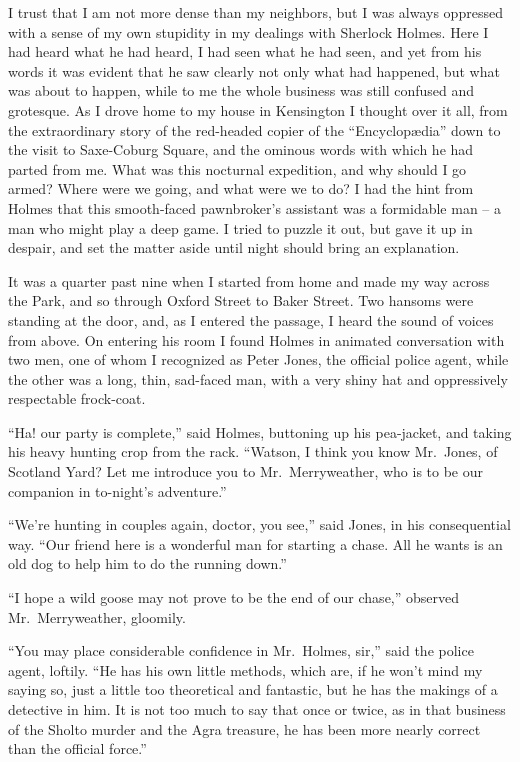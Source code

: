 I trust that I am not more dense than my neighbors, but I
was always oppressed with a sense of my own stupidity in my
dealings with Sherlock Holmes. Here I had heard what he
had heard, I had seen what he had seen, and yet from his
words it was evident that he saw clearly not only what had
happened, but what was about to happen, while to me the
whole business was still confused and grotesque. As I drove
home to my house in Kensington I thought over it all, from
the extraordinary story of the red-headed copier of the
“Encyclopædia” down to the visit to Saxe-Coburg Square, and
the ominous words with which he had parted from me. What
was this nocturnal expedition, and why should I go armed?
Where were we going, and what were we to do? I had the
hint from Holmes that this smooth-faced pawnbroker’s assistant
was a formidable man -- a man who might play a
deep game. I tried to puzzle it out, but gave it up in
despair, and set the matter aside until night should bring an
explanation.

It was a quarter past nine when I started from home and
made my way across the Park, and so through Oxford Street
to Baker Street. Two hansoms were standing at the door,
and, as I entered the passage, I heard the sound of voices
from above. On entering his room I found Holmes in animated
conversation with two men, one of whom I recognized
as Peter Jones, the official police agent, while the other was
a long, thin, sad-faced man, with a very shiny hat and oppressively
respectable frock-coat.

“Ha! our party is complete,” said Holmes, buttoning up
his pea-jacket, and taking his heavy hunting crop from the
rack. “Watson, I think you know Mr.~Jones, of Scotland
Yard? Let me introduce you to Mr.~Merryweather, who is
to be our companion in to-night’s adventure.”

“We’re hunting in couples again, doctor, you see,” said
Jones, in his consequential way. “Our friend here is a wonderful
man for starting a chase. All he wants is an old dog
to help him to do the running down.”

“I hope a wild goose may not prove to be the end of our
chase,” observed Mr.~Merryweather, gloomily.

“You may place considerable confidence in Mr.~Holmes,
sir,” said the police agent, loftily. “He has his own little
methods, which are, if he won’t mind my saying so, just a little
too theoretical and fantastic, but he has the makings of a
detective in him. It is not too much to say that once or
twice, as in that business of the Sholto murder and the Agra
treasure, he has been more nearly correct than the official
force.”

